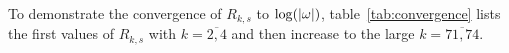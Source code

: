To demonstrate the convergence of $R_{k,s}$ to $\log(\left \lvert \omega \right \rvert)$, table~\ref{tab:convergence} lists the first values of $R_{k,s}$ with $k=\overline{2,4}$ and then increase to the large $k=\overline{71,74}$.


